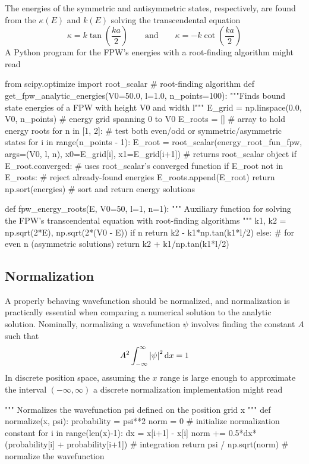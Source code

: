 \documentclass[11pt, a4paper]{article}
\newcommand{\diff}{\mathop{}\!\mathrm{d}} %
\newcommand{\eqtext}[1]{\qquad \text{#1} \qquad}
\begin{document}
The energies of the symmetric and antisymmetric states, respectively, are found from the $ \kappa(E) $ and $ k(E) $ solving the transcendental equation 
\begin{equation*}
	\kappa = k \tan\left(\frac{ka}{2}\right) \eqtext{and} \kappa = -k \cot\left(\frac{ka}{2}\right)
\end{equation*}
A Python program for the FPW's energies with a root-finding algorithm might read
\begin{python}
from scipy.optimize import root_scalar  # root-finding algorithm
def get_fpw_analytic_energies(V0=50.0, l=1.0, n_points=100):
    """Finds bound state energies of a FPW with height V0 and width l"""
    E_grid = np.linspace(0.0, V0, n_points)  # energy grid spanning 0 to V0
    E_roots = []  # array to hold energy roots
    for n in [1, 2]:  # test both even/odd or symmetric/asymmetric states
        for i in range(n_points - 1):
            E_root = root_scalar(energy_root_fun_fpw, args=(V0, l, n), x0=E_grid[i], x1=E_grid[i+1])  # returns root_scalar object
            if E_root.converged:  # uses root_scalar's converged function
                if E_root not in E_roots:  # reject already-found energies
                    E_roots.append(E_root)
    return np.sort(energies)  # sort and return energy solutions

def fpw_energy_roots(E, V0=50, l=1, n=1):
    """ Auxiliary function for solving the FPW's transcendental equation with root-finding algorithms """
    k1, k2 = np.sqrt(2*E), np.sqrt(2*(V0 - E))
    if n %
        return k2 - k1*np.tan(k1*l/2)
    else:  # for even n (asymmetric solutions)
        return k2 + k1/np.tan(k1*l/2)
\end{python}


\subsection{Normalization} \label{bvp:ss:norm}
A properly behaving wavefunction should be normalized, and normalization is practically essential when comparing a numerical solution to the analytic solution. Nominally, normalizing a wavefunction $ \psi $ involves finding the constant $ A $ such that
\begin{equation*}
	A^{2} \int_{-\infty}^{\infty} \abs{\psi}^{2}  \diff x = 1 
\end{equation*}
In discrete position space, assuming the $ x $ range is large enough to approximate the interval $ (-\infty, \infty) $ a discrete normalization implementation might read
\begin{python}
""" Normalizes the wavefunction psi defined on the position grid x """
def normalize(x, psi):
    probability = psi**2  %
    norm = 0  # initialize normalization constant
    for i in range(len(x)-1):
        dx = x[i+1] - x[i]
        norm += 0.5*dx*(probability[i] + probability[i+1])  # integration
    return psi / np.sqrt(norm)  # normalize the wavefunction
\end{python}
\end{document}
